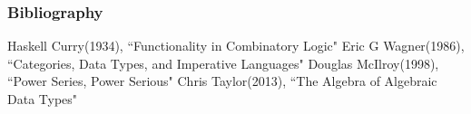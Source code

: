 \documentclass{beamer}
\begin{document}
\frame
{
  \frametitle{Bibliography}
  Haskell Curry(1934), ``Functionality in Combinatory Logic"\newline\newline
  Eric G Wagner(1986), ``Categories, Data Types, and Imperative Languages"\newline\newline
  Douglas McIlroy(1998), ``Power Series, Power Serious"\newline\newline
  Chris Taylor(2013), ``The Algebra of Algebraic Data Types"
}
\end{document}
